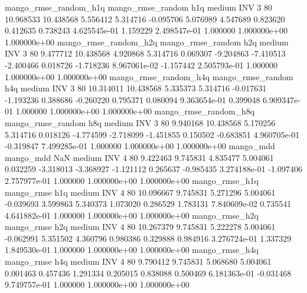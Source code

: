 mango_rmse_random_h1q mango_rmse_random                  h1q     medium      INV                 3 80 10.968533      10.438568 5.556412       5.314716   -0.095706      5.076989      4.547689     0.823620       0.412635  0.738243 4.625545e-01     1.159229   2.498547e-01            1.000000    1.000000e+00        1.000000e+00
mango_rmse_random_h2q mango_rmse_random                  h2q     medium      INV                 3 80  9.477712      10.438568 4.920868       5.314716    0.069307     -9.204863     -7.410513    -2.400466       0.018726 -1.718236 8.967061e-02    -1.157442   2.505793e-01            1.000000    1.000000e+00        1.000000e+00
mango_rmse_random_h4q mango_rmse_random                  h4q     medium      INV                 3 80 10.314011      10.438568 5.335373       5.314716   -0.017631     -1.193236      0.388686    -0.260220       0.795371  0.080094 9.363654e-01     0.399048   6.909347e-01            1.000000    1.000000e+00        1.000000e+00
mango_rmse_random_h8q mango_rmse_random                  h8q     medium      INV                 3 80  9.940168      10.438568 5.170256       5.314716    0.018126     -4.774599     -2.718099    -1.451855       0.150502 -0.683851 4.960705e-01    -0.319847   7.499285e-01            1.000000    1.000000e+00        1.000000e+00
            mango_mdd         mango_mdd                  NaN     medium      INV                 4 80  9.422463       9.745831 4.835477       5.004061    0.032259     -3.318013     -3.368927    -1.121112       0.265637 -0.985435 3.274188e-01    -1.097406   2.757977e-01            1.000000    1.000000e+00        1.000000e+00
       mango_rmse_h1q        mango_rmse                  h1q     medium      INV                 4 80 10.096667       9.745831 5.271296       5.004061   -0.039693      3.599863      5.340373     1.073020       0.286529  1.783131 7.840609e-02     0.735541   4.641882e-01            1.000000    1.000000e+00        1.000000e+00
       mango_rmse_h2q        mango_rmse                  h2q     medium      INV                 4 80 10.267379       9.745831 5.222278       5.004061   -0.062991      5.351502      4.360796     0.980386       0.329888  0.984916 3.276724e-01     1.337329   1.849530e-01            1.000000    1.000000e+00        1.000000e+00
       mango_rmse_h4q        mango_rmse                  h4q     medium      INV                 4 80  9.790412       9.745831 5.068680       5.004061    0.001463      0.457436      1.291334     0.205015       0.838088  0.500469 6.181363e-01    -0.031468   9.749757e-01            1.000000    1.000000e+00        1.000000e+00
